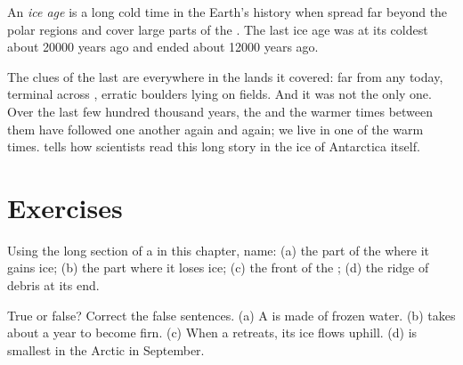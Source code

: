 \begin{definition}\label{def:g8:ice-on-earth:ice-age}
An \emph{ice age} is a long cold time in the Earth's history when  spread far beyond the polar regions and cover large parts of the
. The last ice age was at its coldest about \num{20000} years
ago and ended about \num{12000} years ago.
\end{definition}

The clues of the last  are everywhere in the lands it covered:
 far from any  today, terminal  across
, erratic boulders lying on fields. And it was not the only one.
Over the last few hundred thousand years, the  and the warmer
times between them have followed one another again and again; we live in
one of the warm times.  tells how
scientists read this long story in the ice of Antarctica itself.

\section{Exercises}

\begin{exercise}[$\star$]\label{exo:g8:ice-on-earth:1}
Using the long section of a  in this chapter, name: (a) the part
of the  where it gains ice; (b) the part where it loses ice;
(c) the front of the ; (d) the ridge of  debris at its end.
\end{exercise}

\begin{exercise}[$\star$]\label{exo:g8:ice-on-earth:2}
True or false? Correct the false sentences. (a) A  is made of
frozen  water. (b)  takes about a year to become firn. (c) When a
 retreats, its ice flows uphill. (d)  is smallest in the
Arctic in September.
\end{exercise}


